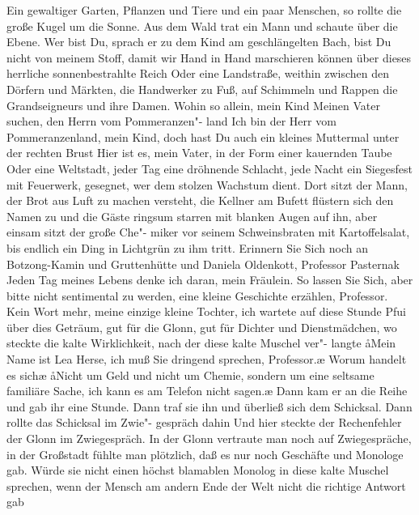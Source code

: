 Ein gewaltiger Garten, Pflanzen und Tiere und ein paar
Menschen, so rollte die große Kugel um die Sonne. Aus dem
Wald trat ein Mann und schaute über die Ebene. Wer bist
Du, sprach er zu dem Kind am geschlängelten Bach, bist Du
nicht von meinem Stoff, damit wir Hand in Hand marschieren
können über dieses herrliche sonnenbestrahlte Reich\punkte{}\eingriff{eS44-1}{Reich\punkte{} ] Reich~\punkte{}}
Oder eine Landstraße, weithin zwischen den Dörfern und
Märkten, die Handwerker zu Fuß, auf Schimmeln und Rappen
die Grandseigneurs und ihre Damen. Wohin so allein, mein
Kind\frag{} Meinen Vater suchen, den Herrn vom Pommeranzen"-%
land\ausr{} Ich bin der Herr vom Pommeranzenland, mein Kind,
doch hast Du auch ein kleines Muttermal unter der rechten
Brust\frag{} Hier ist es, mein Vater, in der Form einer kauernden
Taube\punkte{} Oder eine Weltstadt, jeder Tag eine dröhnende
Schlacht, jede Nacht ein Siegesfest mit Feuerwerk, gesegnet,
wer dem stolzen Wachstum dient. Dort sitzt der Mann, der
Brot aus Luft zu machen versteht, die Kellner am Bufett
flüstern sich den Namen zu und die Gäste ringsum starren
mit blanken Augen auf ihn, aber einsam sitzt der große Che"-%
miker vor seinem Schweinsbraten mit Kartoffelsalat, bis
endlich ein Ding in Lichtgrün zu ihm tritt. Erinnern Sie Sich\eingriff{eS44-2}{Sich ] sich}
noch an Botzong-Kamin und Gruttenhütte und Daniela
Oldenkott, Professor Pasternak\frag{} Jeden Tag meines Lebens
denke ich daran, mein Fräulein. So lassen Sie Sich\eingriff{eS45-1}{Sich ] sich}, aber bitte
nicht sentimental zu werden, eine kleine Geschichte erzählen,
Professor. Kein Wort mehr, meine einzige kleine Tochter,
ich wartete auf diese Stunde\punkte{} Pfui über dies Geträum,
gut für die Glonn, gut für Dichter und Dienstmädchen, wo
steckte die kalte Wirklichkeit, nach der diese kalte Muschel ver"-%
langte\frag{} \aa{}Mein Name ist Lea Herse, ich muß Sie dringend
sprechen, Professor.\ae{} \aanah{}Worum handelt es sich\frag{}\ae{} \aa{}Nicht um
Geld und nicht um Chemie, sondern um eine seltsame familiäre
Sache, ich kann es am Telefon nicht sagen.\ae{} Dann kam er an
die Reihe und gab ihr eine Stunde. Dann traf sie ihn und
überließ sich dem Schicksal. Dann rollte das Schicksal im Zwie"-%
gespräch dahin\punkte{}\eingriff{eS45-2}{dahin\punkte{} ] dahin \punkte{}} Und hier steckte der Rechenfehler der
Glonn\dopp{} im Zwiegespräch. In der Glonn vertraute man noch
auf Zwiegespräche, in der Großstadt fühlte man plötzlich,
daß es nur noch Geschäfte und Monologe gab. Würde sie
nicht einen höchst blamablen Monolog in diese kalte Muschel
sprechen, wenn der Mensch am andern Ende der Welt nicht
die richtige Antwort gab\frag{}

